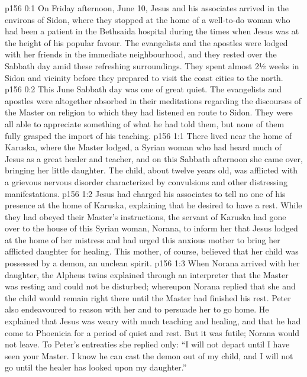 \author{Midwayer Commission}
\vs p156 0:1 On Friday afternoon, June 10, Jesus and his associates arrived in the environs of Sidon, where they stopped at the home of a well\hyp{}to\hyp{}do woman who had been a patient in the Bethsaida hospital during the times when Jesus was at the height of his popular favour. The evangelists and the apostles were lodged with her friends in the immediate neighbourhood, and they rested over the Sabbath day amid these refreshing surroundings. They spent almost 2½ weeks in Sidon and vicinity before they prepared to visit the coast cities to the north.
\vs p156 0:2 This June Sabbath day was one of great quiet. The evangelists and apostles were altogether absorbed in their meditations regarding the discourses of the Master on religion to which they had listened en route to Sidon. They were all able to appreciate something of what he had told them, but none of them fully grasped the import of his teaching.
\vs p156 1:1 There lived near the home of Karuska, where the Master lodged, a Syrian woman who had heard much of Jesus as a great healer and teacher, and on this Sabbath afternoon she came over, bringing her little daughter. The child, about twelve years old, was afflicted with a grievous nervous disorder characterized by convulsions and other distressing manifestations.
\vs p156 1:2 Jesus had charged his associates to tell no one of his presence at the home of Karuska, explaining that he desired to have a rest. While they had obeyed their Master’s instructions, the servant of Karuska had gone over to the house of this Syrian woman, Norana, to inform her that Jesus lodged at the home of her mistress and had urged this anxious mother to bring her afflicted daughter for healing. This mother, of course, believed that her child was possessed by a demon, an unclean spirit.
\vs p156 1:3 When Norana arrived with her daughter, the Alpheus twins explained through an interpreter that the Master was resting and could not be disturbed; whereupon Norana replied that she and the child would remain right there until the Master had finished his rest. Peter also endeavoured to reason with her and to persuade her to go home. He explained that Jesus was weary with much teaching and healing, and that he had come to Phoenicia for a period of quiet and rest. But it was futile; Norana would not leave. To Peter’s entreaties she replied only: “I will not depart until I have seen your Master. I know he can cast the demon out of my child, and I will not go until the healer has looked upon my daughter.”
